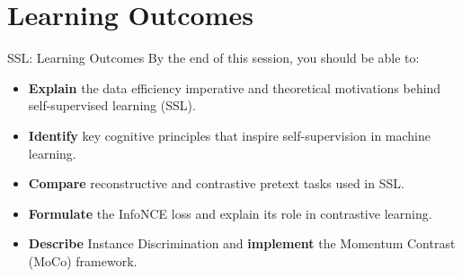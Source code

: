 \section{Learning Outcomes}
\begin{frame}{SSL: Learning Outcomes}
    By the end of this session, you should be able to:
    \begin{itemize}
        \item \textbf{Explain} the data efficiency imperative and theoretical motivations behind self-supervised learning (SSL).
        \item \textbf{Identify} key cognitive principles that inspire self-supervision in machine learning.
        \item \textbf{Compare} reconstructive and contrastive pretext tasks used in SSL.
        \item \textbf{Formulate} the InfoNCE loss and explain its role in contrastive learning.
        \item \textbf{Describe} Instance Discrimination and \textbf{implement} the Momentum Contrast (MoCo) framework.
    \end{itemize}
\end{frame}